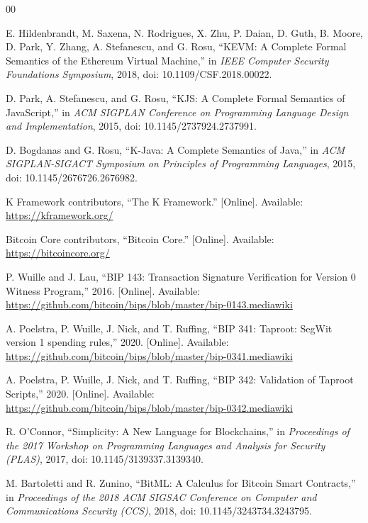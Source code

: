\documentclass[conference]{IEEEtran}
\begin{document}
\begin{thebibliography}{00}
\sloppy

E. Hildenbrandt, M. Saxena, N. Rodrigues, X. Zhu, P. Daian, D. Guth, B. Moore,
D. Park, Y. Zhang, A. Stefanescu, and G. Rosu, ``KEVM: A Complete Formal
Semantics of the Ethereum Virtual Machine,'' in \emph{IEEE Computer Security
Foundations Symposium}, 2018, doi: 10.1109/CSF.2018.00022.

D. Park, A. Stefanescu, and G. Rosu, ``KJS: A Complete Formal Semantics of
JavaScript,'' in \emph{ACM SIGPLAN Conference on Programming Language Design
and Implementation}, 2015, doi: 10.1145/2737924.2737991.

D. Bogdanas and G. Rosu, ``K-Java: A Complete Semantics of Java,'' in
\emph{ACM SIGPLAN-SIGACT Symposium on Principles of Programming Languages},
2015, doi: 10.1145/2676726.2676982.

K Framework contributors, ``The K Framework.'' [Online]. Available:
\url{https://kframework.org/}

Bitcoin Core contributors, ``Bitcoin Core.'' [Online]. Available:
\url{https://bitcoincore.org/}

P. Wuille and J. Lau, ``BIP 143: Transaction Signature Verification for Version
0 Witness Program,'' 2016. [Online]. Available:
\url{https://github.com/bitcoin/bips/blob/master/bip-0143.mediawiki}

A. Poelstra, P. Wuille, J. Nick, and T. Ruffing, ``BIP 341: Taproot: SegWit
version 1 spending rules,'' 2020. [Online]. Available:
\url{https://github.com/bitcoin/bips/blob/master/bip-0341.mediawiki}

A. Poelstra, P. Wuille, J. Nick, and T. Ruffing, ``BIP 342: Validation of
Taproot Scripts,'' 2020. [Online]. Available:
\url{https://github.com/bitcoin/bips/blob/master/bip-0342.mediawiki}

R. O'Connor, ``Simplicity: A New Language for Blockchains,'' in
\emph{Proceedings of the 2017 Workshop on Programming Languages and Analysis
for Security (PLAS)}, 2017, doi: 10.1145/3139337.3139340.

M. Bartoletti and R. Zunino, ``BitML: A Calculus for Bitcoin Smart
Contracts,'' in \emph{Proceedings of the 2018 ACM SIGSAC Conference on
Computer and Communications Security (CCS)}, 2018, doi:
10.1145/3243734.3243795.

\end{thebibliography}
\end{document}
